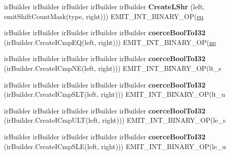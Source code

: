 \begin{DoxyCompactItemize}
ir\+Builder ir\+Builder ir\+Builder ir\+Builder ir\+Builder {\bfseries Create\+L\+Shr} (left, emit\+Shift\+Count\+Mask(type, right))) E\+M\+I\+T\+\_\+\+I\+N\+T\+\_\+\+B\+I\+N\+A\+R\+Y\+\_\+\+OP(\mbox{\hyperlink{structeq}{eq}}
\item 
\mbox{\label{struct_l_l_v_m_j_i_t_1_1_emit_function_context_a035e6d6986e61d6fd55dac8c76162333}} 
ir\+Builder ir\+Builder ir\+Builder ir\+Builder ir\+Builder {\bfseries coerce\+Bool\+To\+I32} (ir\+Builder.\+Create\+I\+Cmp\+EQ(left, right))) E\+M\+I\+T\+\_\+\+I\+N\+T\+\_\+\+B\+I\+N\+A\+R\+Y\+\_\+\+OP(\mbox{\hyperlink{structne}{ne}}
\item 
\mbox{\label{struct_l_l_v_m_j_i_t_1_1_emit_function_context_adb6339c2b6f790d4995e82d89d4ee7e0}} 
ir\+Builder ir\+Builder ir\+Builder ir\+Builder ir\+Builder {\bfseries coerce\+Bool\+To\+I32} (ir\+Builder.\+Create\+I\+Cmp\+NE(left, right))) E\+M\+I\+T\+\_\+\+I\+N\+T\+\_\+\+B\+I\+N\+A\+R\+Y\+\_\+\+OP(lt\+\_\+s
\item 
\mbox{\label{struct_l_l_v_m_j_i_t_1_1_emit_function_context_a1ba6dfc219e2c5ec22ea3f8341230e58}} 
ir\+Builder ir\+Builder ir\+Builder ir\+Builder ir\+Builder {\bfseries coerce\+Bool\+To\+I32} (ir\+Builder.\+Create\+I\+Cmp\+S\+LT(left, right))) E\+M\+I\+T\+\_\+\+I\+N\+T\+\_\+\+B\+I\+N\+A\+R\+Y\+\_\+\+OP(lt\+\_\+u
\item 
\mbox{\label{struct_l_l_v_m_j_i_t_1_1_emit_function_context_a5937c08f309253fe2159d2721c4a6783}} 
ir\+Builder ir\+Builder ir\+Builder ir\+Builder ir\+Builder {\bfseries coerce\+Bool\+To\+I32} (ir\+Builder.\+Create\+I\+Cmp\+U\+LT(left, right))) E\+M\+I\+T\+\_\+\+I\+N\+T\+\_\+\+B\+I\+N\+A\+R\+Y\+\_\+\+OP(le\+\_\+s
\item 
\mbox{\label{struct_l_l_v_m_j_i_t_1_1_emit_function_context_ae5b44376cbc5069f170df01c9a997800}} 
ir\+Builder ir\+Builder ir\+Builder ir\+Builder ir\+Builder {\bfseries coerce\+Bool\+To\+I32} (ir\+Builder.\+Create\+I\+Cmp\+S\+LE(left, right))) E\+M\+I\+T\+\_\+\+I\+N\+T\+\_\+\+B\+I\+N\+A\+R\+Y\+\_\+\+OP(le\+\_\+u
\item 
\mbox{\label{struct_l_l_v_m_j_i_t_1_1_emit_function_context_a057b1fef1830b68f07908f1ef42df5e3}} 

\end{DoxyCompactItemize}
